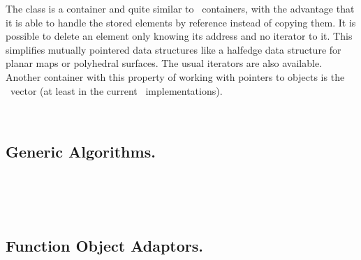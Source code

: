 The class  is a container and quite similar
to \stl\ containers, with the advantage that it is able to handle the
stored elements by reference instead of copying them. It is possible
to delete an element only knowing its address and no iterator to it.
This simplifies mutually pointered data structures like a halfedge
data structure for planar maps or polyhedral surfaces. The usual
iterators are also available.  Another container with this property of
working with pointers to objects is the \stl\ vector (at least in the
current \stl\ implementations).

\\

\subsection*{Generic Algorithms.}

\\
\\
\\

\subsection*{Function Object Adaptors.}

\\
\\
\\
\\
\\
\\
\\
\\
\\
\\
\\
\\

